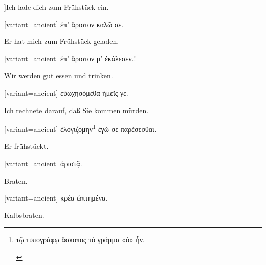 ]\indent Ich lade dich zum Frühstück ein.

\switchcolumn

\begin{greek}[variant=ancient]%
ἐπ' ἄριστον καλῶ σε.

\end{greek}%
\switchcolumn*

Er hat mich zum Frühstück geladen.

\switchcolumn

\begin{greek}[variant=ancient]%
ἐπ' ἄριστον μ' ἐκάλεσεν.!

\end{greek}%
\switchcolumn*

Wir werden gut essen und trinken.

\switchcolumn

\begin{greek}[variant=ancient]%
εὐωχησόμεθα ἡμεῖς γε.

\end{greek}%
\switchcolumn*

Ich rechnete darauf, daß Sie kommen mürden.

\switchcolumn

\begin{greek}[variant=ancient]%
ἐλογιζόμην\footnote{\begin{latin}%
\textgreek[variant=ancient]{τῷ τυπογράφῳ ἄσκοπος τὸ γράμμα «ό» ἦν.}\end{latin}%
} ἐγώ σε παρέσεσθαι.

\end{greek}%
\switchcolumn*

Er frühstückt.

\switchcolumn

\begin{greek}[variant=ancient]%
ἀριστᾷ.

\end{greek}%
\switchcolumn*

\myafterpagetrue{}Braten. 

\switchcolumn

\begin{greek}[variant=ancient]%
κρέα ὠπτημένα.

\end{greek}%
\switchcolumn*\bgroup{} Kalbs\textcompwordmark{}braten.

\egroup\switchcolumn\bgroup

